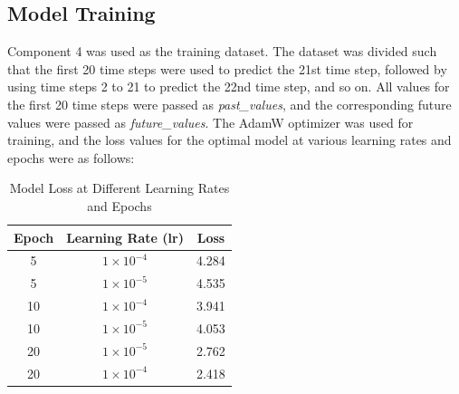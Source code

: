 \subsection{Model Training}
\label{subsec:Training}
Component 4 was used as the training dataset. The dataset was divided such that the first 20 time steps were used to predict the 21st time step, followed by using time steps 2 to 21 to predict the 22nd time step, and so on. All values for the first 20 time steps were passed as \textit{past\_values}, and the corresponding future values were passed as \textit{future\_values}. The AdamW optimizer was used for training, and the loss values for the optimal model at various learning rates and epochs were as follows:
\begin{table}[h]
	\centering
	\begin{tabular}{|c|c|c|}
		\hline
		\textbf{Epoch} & \textbf{Learning Rate (lr)} & \textbf{Loss} \\
		\hline
		5 & $1\times10^{-4}$ & 4.284 \\
		5 & $1\times10^{-5}$ & 4.535 \\
		10 & $1\times10^{-4}$ & 3.941 \\
		10 & $1\times10^{-5}$ & 4.053 \\
		20 & $1\times10^{-5}$ & 2.762 \\
		20 & $1\times10^{-4}$ & 2.418 \\
		\hline
	\end{tabular}
	\caption{Model Loss at Different Learning Rates and Epochs}
	\label{tab:loss_table}
\end{table}

